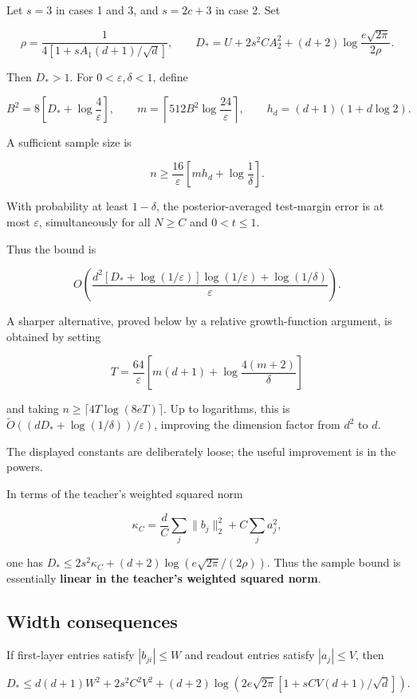 \documentclass[11pt]{article}
\begin{document}
Let \(s=3\) in cases 1 and 3, and \(s=2c+3\) in case 2. Set

\[
\rho=\frac1{4[1+sA_1(d+1)/\sqrt d]},\qquad
D_*=U+2s^2C A_2^2+(d+2)\log\frac{e\sqrt{2\pi}}{2\rho}.
\]

Then \(D_*>1\). For \(0<\varepsilon,\delta<1\), define

\[
B^2=8\left[D_*+\log\frac4\varepsilon\right],\qquad
m=\left\lceil512 B^2\log\frac{24}{\varepsilon}\right\rceil,
\qquad h_d=(d+1)(1+d\log2).
\]

A sufficient sample size is

\[
\boxed{\quad n\ge\frac{16}{\varepsilon}
\left[m h_d+\log\frac1\delta\right].\quad}
\]

With probability at least \(1-\delta\), the posterior-averaged
test-margin error is at most \(\varepsilon\), simultaneously for all
\(N\ge C\) and \(0<t\le1\).

Thus the bound is

\[
O\!\left(\frac{d^2[D_*+\log(1/\varepsilon)]\log(1/\varepsilon)
 +\log(1/\delta)}{\varepsilon}\right).
\]

A sharper alternative, proved below by a relative growth-function
argument, is obtained by setting

\[
T=\frac{64}{\varepsilon}
\left[m(d+1)+\log\frac{4(m+2)}{\delta}\right]
\]

and taking \(n\ge\lceil4T\log(8eT)\rceil\). Up to logarithms, this is
\(\widetilde O((dD_*+\log(1/\delta))/\varepsilon)\), improving the
dimension factor from \(d^2\) to \(d\).

The displayed constants are deliberately loose; the useful improvement
is in the powers.

In terms of the teacher's weighted squared norm

\[
\kappa_C=\frac dC\sum_j\|b_j\|_2^2+C\sum_j a_j^2,
\]

one has \(D_*\le2s^2\kappa_C+(d+2)\log(e\sqrt{2\pi}/(2\rho))\). Thus the
sample bound is essentially \textbf{linear in the teacher's weighted
squared norm}.

\subsection{Width consequences}\label{width-consequences}

If first-layer entries satisfy \(|b_{ji}|\le W\) and readout entries
satisfy \(|a_j|\le V\), then

\[
D_*\le d(d+1)W^2+2s^2 C^2V^2
 +(d+2)\log\!\left(2e\sqrt{2\pi}[1+sCV(d+1)/\sqrt d]\right).
\]
\end{document}
